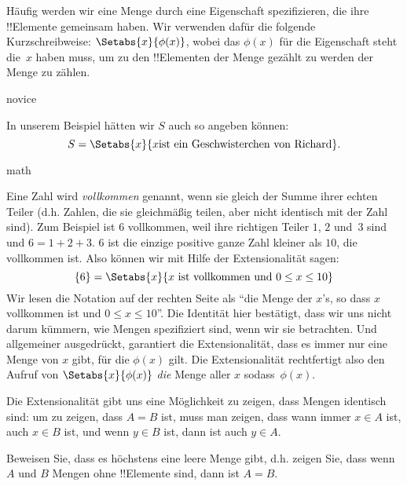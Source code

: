 \documentclass[../../../include/open-logic-section]{subfiles}
\begin{document}
Häufig werden wir eine Menge durch eine Eigenschaft spezifizieren, die ihre !!{Element}e
gemeinsam haben. Wir verwenden dafür die folgende Kurzschreibweise:
$\Setabs{x}{\phi(x)}$, wobei das $\phi(x)$ für die Eigenschaft steht
die~$x$ haben muss, um zu den !!{Element}en der Menge gezählt zu werden
der Menge zu zählen. 

\begin{tagblock}{novice}
\begin{ex}
In unserem Beispiel hätten wir $S$ auch so angeben können:
\[
S = \Setabs{x}{x \text{ist ein Geschwisterchen von Richard}}.
\]
\end{ex}
\end{tagblock}

\begin{tagblock}{math}
\begin{ex}
Eine Zahl wird \emph{vollkommen} genannt, wenn sie gleich der Summe ihrer
echten Teiler (d.h. Zahlen, die sie gleichmäßig teilen, aber nicht
identisch mit der Zahl sind). Zum Beispiel ist $6$ vollkommen, weil ihre
richtigen Teiler $1$, $2$ und~$3$ sind und $6 = 1 + 2 + 3$. $6$ ist die einzige positive ganze Zahl kleiner als $10$, die vollkommen ist. Also
können wir mit Hilfe der Extensionalität sagen:
\[
	\{6\} = \Setabs{x}{x\text{ ist vollkommen und }0 \leq x \leq 10}
\]
Wir lesen die Notation auf der rechten Seite als ``die Menge der $x$'s, so dass $x$
vollkommen ist und $0 \leq x \leq 10$''. Die Identität hier bestätigt, dass wir uns nicht darum kümmern, wie Mengen spezifiziert sind, wenn wir sie betrachten.
Und allgemeiner ausgedrückt, garantiert die Extensionalität, dass es immer
nur eine Menge von $x$ gibt, für die $\phi(x)$ gilt.
Die Extensionalität rechtfertigt also den Aufruf von 
$\Setabs{x}{\phi(x)}$ \emph{die} Menge aller $x$ sodass~$\phi(x)$.
\end{ex}
\end{tagblock}

Die Extensionalität gibt uns eine Möglichkeit zu zeigen, dass Mengen identisch sind: um zu zeigen, dass $A = B$ ist, muss man zeigen, dass wann immer $x \in A$ ist, auch $x \in B$ ist,
und wenn $y \in B$ ist, dann ist auch $y \in A$.

\begin{prob}
Beweisen Sie, dass es höchstens eine leere Menge gibt, d.h. zeigen Sie, dass wenn $A$ und $B$
Mengen ohne !!{Element}e sind, dann ist $A = B$.
\end{prob}
\end{document}
